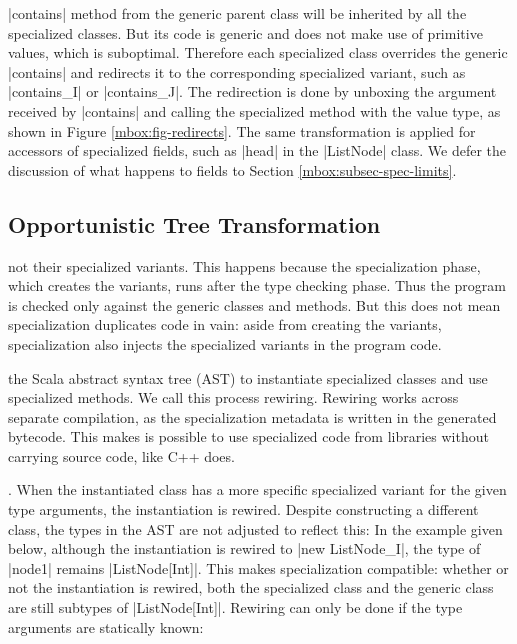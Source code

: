  |contains| method from the generic parent class will be inherited by all the specialized classes. But its code is generic and does not make use of primitive values, which is suboptimal. Therefore each specialized class overrides the generic |contains| and redirects it to the corresponding specialized variant, such as |contains_I| or |contains_J|. The redirection is done by unboxing the argument received by |contains| and calling the specialized method with the value type, as shown in Figure \ref{mbox:fig-redirects}. The same transformation is applied for accessors of specialized fields, such as |head| in the |ListNode| class. We defer the discussion of what happens to fields to Section \ref{mbox:subsec-spec-limits}.

\subsection{Opportunistic Tree Transformation}
\label{mbox:subsec-spec-rewiring}

 not their specialized variants. This happens because the specialization phase, which creates the variants, runs after the type checking phase. Thus the program is checked only against the generic classes and methods. But this does not mean specialization duplicates code in vain: aside from creating the variants, specialization also injects the specialized variants in the program code.

 the Scala abstract syntax tree (AST) to instantiate specialized classes and use specialized methods. We call this process rewiring. Rewiring works across separate compilation, as the specialization metadata is written in the generated bytecode. This makes is possible to use specialized code from libraries without carrying source code, like C++ does.

. When the instantiated class has a more specific specialized variant for the given type arguments, the instantiation is rewired. Despite constructing a different class, the types in the AST are not adjusted to reflect this: In the example given below, although the instantiation is rewired to |new ListNode_I|, the type of |node1| remains |ListNode[Int]|. This makes specialization compatible: whether or not the instantiation is rewired, both the specialized class and the generic class are still subtypes of |ListNode[Int]|. Rewiring can only be done if the type arguments are statically known:

